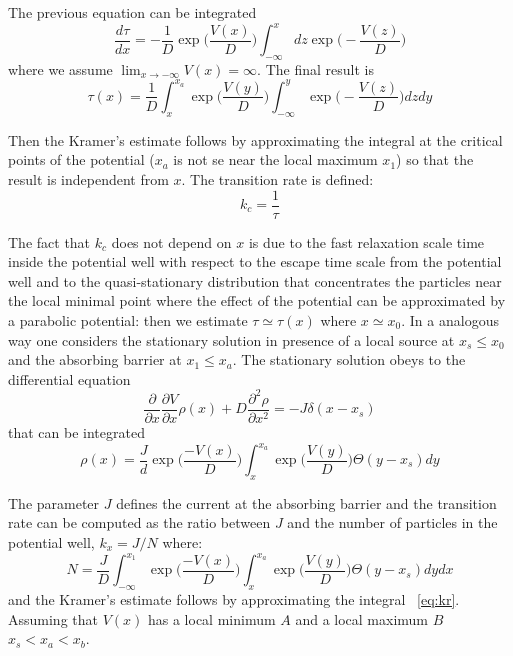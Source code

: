 The previous equation can be integrated
$$
\frac{d\tau}{dx} = - \frac{1}{D} \exp \biggl(\frac{V(x)}{D}\biggr) \int_{-\infty}^x dz \exp \biggl(-\frac{V(z)}{D}\biggr)
$$
where we assume $\lim_{x\to - \infty} V(x) = \infty$. The final result is 
\begin{equation}
\tau(x) = \frac{1}{D} \int_x^{x_a} \exp \biggl(\frac{V(y)}{D}\biggr) \int _{-\infty}^y \exp\biggl(-\frac{V(z)}{D}\biggr) dzdy
\end{equation}

Then the Kramer's estimate follows by approximating the integral at the critical points of the potential ($x_a$ is not se near the local maximum $x_1$) so that the result is independent from $x$. The transition rate is defined:
$$
k_c = \frac{1}{\tau}
$$

The fact that $k_c$ does not depend on $x$ is due to the fast relaxation scale time inside the potential well with respect to the escape time scale from the potential well and to the quasi-stationary distribution that concentrates the particles near the local minimal point where the effect of the potential can be approximated by a parabolic potential: then we estimate $\tau \simeq \tau(x)$ where $x \simeq x_0$.
In a analogous way one considers the stationary solution in presence of a local source at $x_s \le x_0 $ and the absorbing barrier at $x_1 \le x_a$. The stationary solution obeys to the differential equation 
$$
\frac{\partial}{\partial x}\frac{\partial V}{\partial x} \rho(x) + D \frac{\partial^2 \rho}{\partial x^2} = -J \delta(x-x_s)
$$ 
that can be integrated 
$$
\rho(x) = \frac{J}{d} \exp \biggl(\frac{-V(x)}{D}\biggr)\int_x^{x_a} \exp \biggl(\frac{V(y)}{D}\biggr) \Theta(y-x_s) dy
$$

The parameter $J$ defines the current at the absorbing barrier and the transition rate can be computed as the ratio between $J$ and the number of particles in the potential well, $k_x = J/N$ where:
\begin{equation}
N = \frac{J}{D} \int_{-\infty}^{x_1} \exp \biggl(\frac{-V(x)}{D} \biggr) \int_x^{x_a} \exp \biggl(\frac{V(y)}{D} \biggr) \Theta (y-x_s) dydx
\label{eq:kr}
\end{equation}
and the Kramer's estimate follows by approximating the integral ~\ref{eq:kr}. Assuming that $V(x)$ has a local minimum $A$ and a local maximum $B$ $x_s < x_a <x_b $. 

